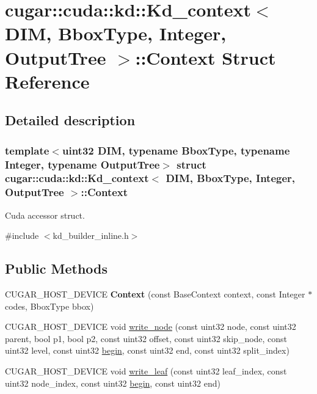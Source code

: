 \hypertarget{structcugar_1_1cuda_1_1kd_1_1_kd__context_1_1_context}{}\section{cugar\+:\+:cuda\+:\+:kd\+:\+:Kd\+\_\+context$<$ D\+IM, Bbox\+Type, Integer, Output\+Tree $>$\+:\+:Context Struct Reference}
\label{structcugar_1_1cuda_1_1kd_1_1_kd__context_1_1_context}


\subsection{Detailed description}
\subsubsection*{template$<$uint32 D\+IM, typename Bbox\+Type, typename Integer, typename Output\+Tree$>$\newline
struct cugar\+::cuda\+::kd\+::\+Kd\+\_\+context$<$ D\+I\+M, Bbox\+Type, Integer, Output\+Tree $>$\+::\+Context}

Cuda accessor struct. 

{\ttfamily \#include $<$kd\+\_\+builder\+\_\+inline.\+h$>$}

\subsection*{Public Methods}
\begin{DoxyCompactItemize}
\item 
\mbox{\label{structcugar_1_1cuda_1_1kd_1_1_kd__context_1_1_context_a3878d0bf036f3f48fabcee2cfade83f8}} 
C\+U\+G\+A\+R\+\_\+\+H\+O\+S\+T\+\_\+\+D\+E\+V\+I\+CE {\bfseries Context} (const Base\+Context context, const Integer $\ast$codes, Bbox\+Type bbox)
\item 
C\+U\+G\+A\+R\+\_\+\+H\+O\+S\+T\+\_\+\+D\+E\+V\+I\+CE void \hyperlink{structcugar_1_1cuda_1_1kd_1_1_kd__context_1_1_context_a62ebef4047ff66f5e575fbcf48786e87}{write\+\_\+node} (const uint32 node, const uint32 parent, bool p1, bool p2, const uint32 offset, const uint32 skip\+\_\+node, const uint32 level, const uint32 \hyperlink{namespacecugar_a2121df08f967e232ea5fe0ee378dee67}{begin}, const uint32 end, const uint32 split\+\_\+index)
\item 
C\+U\+G\+A\+R\+\_\+\+H\+O\+S\+T\+\_\+\+D\+E\+V\+I\+CE void \hyperlink{structcugar_1_1cuda_1_1kd_1_1_kd__context_1_1_context_a6ae8f1b91a2d3d60fcb1d3092e9575de}{write\+\_\+leaf} (const uint32 leaf\+\_\+index, const uint32 node\+\_\+index, const uint32 \hyperlink{namespacecugar_a2121df08f967e232ea5fe0ee378dee67}{begin}, const uint32 end)
\end{DoxyCompactItemize}
